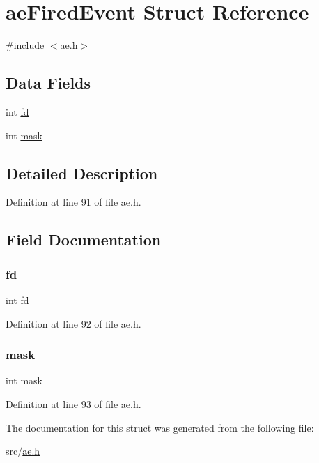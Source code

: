 \hypertarget{structae_fired_event}{}\section{ae\+Fired\+Event Struct Reference}
\label{structae_fired_event}


{\ttfamily \#include $<$ae.\+h$>$}

\subsection*{Data Fields}
\begin{DoxyCompactItemize}
\item 
int \hyperlink{structae_fired_event_a6f8059414f0228f0256115e024eeed4b}{fd}
\item 
int \hyperlink{structae_fired_event_ab77cc972f3ee899689ba053015472ccd}{mask}
\end{DoxyCompactItemize}


\subsection{Detailed Description}


Definition at line 91 of file ae.\+h.



\subsection{Field Documentation}
\mbox{\label{structae_fired_event_a6f8059414f0228f0256115e024eeed4b}} 
\subsubsection{\texorpdfstring{fd}{fd}}
{\footnotesize\ttfamily int fd}



Definition at line 92 of file ae.\+h.

\mbox{\label{structae_fired_event_ab77cc972f3ee899689ba053015472ccd}} 
\subsubsection{\texorpdfstring{mask}{mask}}
{\footnotesize\ttfamily int mask}



Definition at line 93 of file ae.\+h.



The documentation for this struct was generated from the following file\+:\begin{DoxyCompactItemize}
\item 
src/\hyperlink{ae_8h}{ae.\+h}\end{DoxyCompactItemize}

